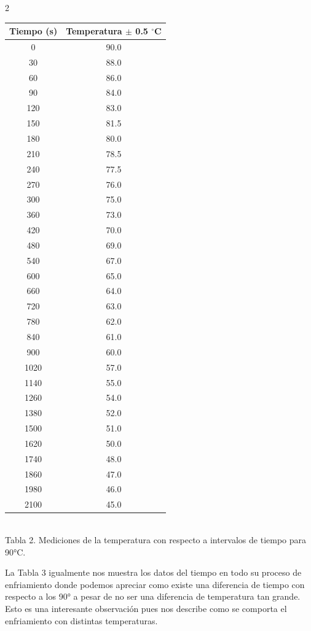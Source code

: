 \documentclass[11pt,letterpaper]{article}
\begin{document}
\begin{multicols}{2}
\begin{tabular}{|c|c|}
	\hline
	\textbf{Tiempo (s)} & \textbf{Temperatura } $\pm$ 0.5 $^\circ$C \\ \hline
		0    & 90.0  \\ \hline
		30   & 88.0  \\ \hline
		60   & 86.0  \\ \hline
		90   & 84.0  \\ \hline
		120  & 83.0  \\ \hline
		150  & 81.5  \\ \hline
		180  & 80.0  \\ \hline
		210  & 78.5  \\ \hline
		240  & 77.5  \\ \hline
		270  & 76.0  \\ \hline
		300  & 75.0  \\ \hline
		360  & 73.0  \\ \hline
		420  & 70.0  \\ \hline
		480  & 69.0  \\ \hline
		540  & 67.0  \\ \hline
		600  & 65.0  \\ \hline
		660  & 64.0  \\ \hline
		720  & 63.0  \\ \hline
		780  & 62.0  \\ \hline
		840  & 61.0  \\ \hline
		900  & 60.0  \\ \hline
		1020 & 57.0  \\ \hline
		1140 & 55.0  \\ \hline
		1260 & 54.0  \\ \hline
		1380 & 52.0  \\ \hline
		1500 & 51.0  \\ \hline
		1620 & 50.0  \\ \hline
		1740 & 48.0  \\ \hline
		1860 & 47.0  \\ \hline
		1980 & 46.0  \\ \hline
		2100 & 45.0  \\ \hline
\end{tabular}
\\Tabla 2. Mediciones de la temperatura con respecto a intervalos de tiempo para 90°C.
    

La Tabla 3 igualmente nos muestra los datos del tiempo en todo su proceso de enfriamiento donde podemos apreciar como existe una diferencia de tiempo con respecto a los 90° a pesar de no ser una diferencia de temperatura tan grande. Esto es una interesante observación pues nos describe como se comporta el enfriamiento con distintas temperaturas.


\end{multicols}
\end{document}
